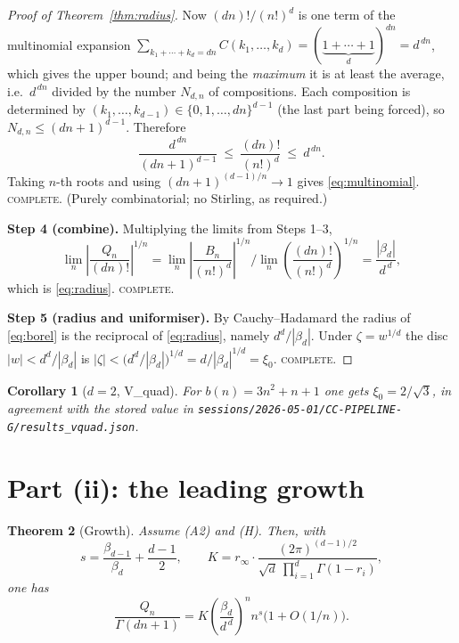 \documentclass[11pt]{article}
\newtheorem{theorem}{Theorem}
\newtheorem{corollary}[theorem]{Corollary}
\theoremstyle{definition}
\newcommand{\bd}{\beta_d}
\newcommand{\bdm}{\beta_{d-1}}
\newcommand{\rinf}{r_\infty}
\begin{document}
\begin{proof}[Proof of Theorem~\ref{thm:radius}]
Now $(dn)!/(n!)^d$ is one term of the multinomial expansion
$\sum_{k_1+\cdots+k_d=dn}C(k_1,\dots,k_d)=(\underbrace{1+\cdots+1}_{d})^{dn}=d^{\,dn}$,
which gives the upper bound; and being the \emph{maximum} it is at least the
average, i.e.\ $d^{\,dn}$ divided by the number $N_{d,n}$ of compositions. Each
composition is determined by $(k_1,\dots,k_{d-1})\in\{0,1,\dots,dn\}^{d-1}$
(the last part being forced), so $N_{d,n}\le(dn+1)^{d-1}$. Therefore
\[
\frac{d^{\,dn}}{(dn+1)^{d-1}}\ \le\ \frac{(dn)!}{(n!)^d}\ \le\ d^{\,dn}.
\]
Taking $n$-th roots and using $(dn+1)^{(d-1)/n}\to1$ gives
\eqref{eq:multinomial}. \textsc{complete.} (Purely combinatorial; no Stirling,
as required.)

\medskip\noindent\textbf{Step 4 (combine).}
Multiplying the limits from Steps 1--3,
\[
\lim_n\left|\frac{Q_n}{(dn)!}\right|^{1/n}
=\lim_n\left|\frac{B_n}{(n!)^{d}}\right|^{1/n}
\Big/\lim_n\left(\frac{(dn)!}{(n!)^{d}}\right)^{1/n}
=\frac{|\bd|}{d^{\,d}},
\]
which is \eqref{eq:radius}. \textsc{complete.}

\medskip\noindent\textbf{Step 5 (radius and uniformiser).}
By Cauchy--Hadamard the radius of \eqref{eq:borel} is the reciprocal of
\eqref{eq:radius}, namely $d^d/|\bd|$. Under $\zeta=w^{1/d}$ the disc
$|w|<d^d/|\bd|$ is $|\zeta|<\bigl(d^d/|\bd|\bigr)^{1/d}=d/|\bd|^{1/d}=\xi_0$.
\textsc{complete.}
\end{proof}

\begin{corollary}[$d=2$, V\_quad]\label{cor:vquad}
For $b(n)=3n^2+n+1$ one gets $\xi_0=2/\sqrt3$, in agreement with the stored
value in \texttt{sessions/2026-05-01/CC-PIPELINE-G/results\_vquad.json}.
\end{corollary}

\section{Part (ii): the leading growth}

\begin{theorem}[Growth]\label{thm:growth}
Assume \textup{(A2)} and \textup{(H)}. Then, with
\begin{equation}\label{eq:sK}
s=\frac{\bdm}{\bd}+\frac{d-1}{2},
\qquad
K=\rinf\cdot\frac{(2\pi)^{(d-1)/2}}{\sqrt{d}\ \prod_{i=1}^{d}\Gamma(1-r_i)},
\end{equation}
one has
\begin{equation}\label{eq:growth}
\frac{Q_n}{\Gamma(dn+1)}
=K\left(\frac{\bd}{d^{\,d}}\right)^{\!n} n^{s}\bigl(1+O(1/n)\bigr).
\end{equation}
\end{theorem}
\end{document}

